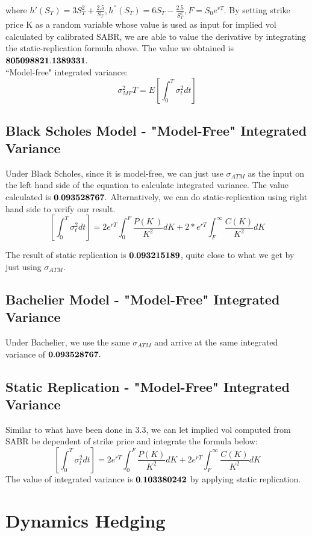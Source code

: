 \documentclass[fleqn,12pt]{SelfArx}
\begin{document}
\noindent where $h'(S_T)=3S_T^2+\frac{2.5}{S_T}, h^{''}(S_T)=6S_T-\frac{2.5}{S_T^2}, F=S_0e^{rT}.$
By setting strike price K as a random variable whose value is used as input for implied vol calculated by calibrated SABR, we are able to value the derivative by integrating the static-replication formula above. The value we obtained is $\bf{805098821.1389331.}$\\


\noindent``Model-free" integrated variance:
$$\sigma_{MF}^2 T=E\left[\int_{0}^{T}\sigma_t^2 dt \right]$$

\subsection{Black Scholes Model - "Model-Free" Integrated Variance}
\noindent Under Black Scholes, since it is model-free, we can just use $\sigma_{ATM}$ as the input on the left hand side of the equation to calculate integrated variance. The value calculated is $\bf{0.093528767.}$ Alternatively, we can do static-replication using right hand side to verify our result.
$$\left[\int_{0}^{T}\sigma_t^2 dt\right]=2e^{rT}\int_{0}^{F}\frac{P(K\	)}{K^2}dK+2*e^{rT}\int_{F}^{\infty}\frac{C(K)}{K^2}dK$$

\noindent The result of static replication is $\bf{0.093215189}$, quite close to what we get by just using $\sigma_{ATM}$.\\

\subsection{Bachelier Model - "Model-Free" Integrated Variance}
Under Bachelier, we use the same $\sigma_{ATM}$ and arrive at the same integrated variance of $\bf{ 0.093528767}.$\\

\subsection{Static Replication - "Model-Free" Integrated Variance}
Similar to what have been done in 3.3, we can let implied vol computed from SABR be dependent of strike price and integrate the formula below:
$$\left[\int_{0}^{T}\sigma_t^2 dt\right]=2e^{rT}\int_{0}^{F}\frac{P(K)}{K^2}dK+2e^{rT}\int_{F}^{\infty}\frac{C(K)}{K^2}dK$$
The value of integrated variance is $\bf{0.103380242}$ by applying static replication.

\newpage
\section{Dynamics Hedging}
\end{document}
